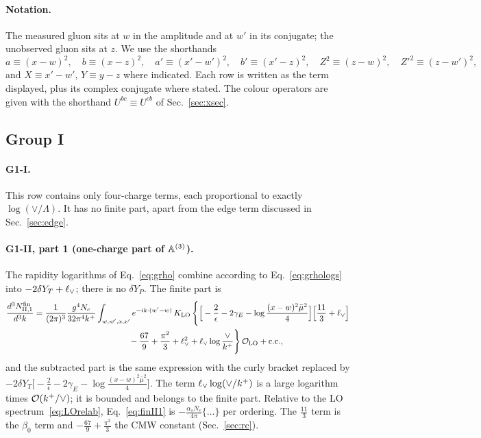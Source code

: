 \paragraph*{Notation.} The measured gluon sits at $w$ in the amplitude and at $w'$ in its conjugate; the unobserved gluon sits at $z$. We use the shorthands
\begin{equation}
a\equiv(x-w)^2,\quad b\equiv(x-z)^2,\quad a'\equiv(x'-w')^2,\quad b'\equiv(x'-z)^2,\quad Z^2\equiv(z-w)^2,\quad Z'^2\equiv(z-w')^2,
\end{equation}
and $X\equiv x'-w'$, $Y\equiv y-z$ where indicated. Each row is written as the term displayed, plus its complex conjugate where stated. The colour operators are given with the shorthand $U^{bc}\equiv U^{cb}$ of Sec.~\ref{sec:xsec}.

\subsection{Group I}\label{sec:finiteG1}

\paragraph*{G1-I.} This row contains only four-charge terms, each proportional to exactly $\log(\vee/\Lambda)$. It has no finite part, apart from the edge term discussed in Sec.~\ref{sec:edge}.

\paragraph*{G1-II, part 1 (one-charge part of $\mathbb{A}^{(3)}$).} The rapidity logarithms of Eq.~\eqref{eq:grho} combine according to Eq.~\eqref{eq:grhologs} into $-2\delta Y_T+\ell_{\vee}$; there is no $\delta Y_P$. The finite part is
\begin{align}
\frac{d^3N^{\rm fin}_{\rm II,1}}{d^3k}={}&\frac{1}{(2\pi)^3}\frac{g^4N_c}{32\pi^4k^+}\int_{w,w',x,x'}e^{-ik\cdot(w'-w)}\,K_{\rm LO}\,\Bigg\{\Big[-\frac2\epsilon-2\gamma_E-\log\frac{(x-w)^2\bar\mu^2}{4}\Big]\Big[\frac{11}{3}+\lV\Big]\notag\\
&\hspace{10em}-\frac{67}{9}+\frac{\pi^2}{3}+\lV^2+\lV\log\frac{\vee}{k^+}\Bigg\}\,\Ord_{\rm LO}+{\rm c.c.},
\label{eq:finII1}
\end{align}
and the subtracted part is the same expression with the curly bracket replaced by $-2\delta Y_T\big[-\frac2\epsilon-2\gamma_E-\log\frac{(x-w)^2\bar\mu^2}{4}\big]$. The term $\ell_{\vee}\log(\vee/k^+)$ is a large logarithm times $\mathcal{O}(k^+/\vee)$; it is bounded and belongs to the finite part. Relative to the LO spectrum~\eqref{eq:LOrelab}, Eq.~\eqref{eq:finII1} is $-\frac{\alpha_sN_c}{4\pi}\{\dots\}$ per ordering. The $\frac{11}{3}$ term is the $\beta_0$ term and $-\frac{67}{9}+\frac{\pi^2}{3}$ the CMW constant (Sec.~\ref{sec:rc}).

